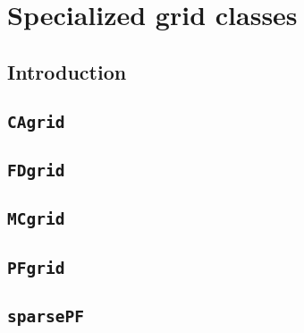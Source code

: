 
\chapter{Specialized grid classes}

\section{Introduction}

\section{{\tt CAgrid}}

\section{{\tt FDgrid}}

\section{{\tt MCgrid}}

\section{{\tt PFgrid}}

\section{{\tt sparsePF}}


